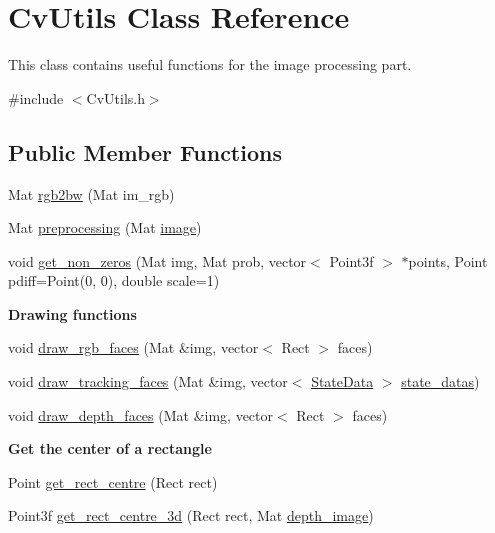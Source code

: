 \hypertarget{classCvUtils}{\section{Cv\-Utils Class Reference}
\label{classCvUtils}
}


This class contains useful functions for the image processing part.  




{\ttfamily \#include $<$Cv\-Utils.\-h$>$}

\subsection*{Public Member Functions}
\begin{DoxyCompactItemize}
\item 
Mat \hyperlink{classCvUtils_aa5bded11699d39af25c420aed2ade0ba}{rgb2bw} (Mat im\-\_\-rgb)
\item 
Mat \hyperlink{classCvUtils_a47189479acb67a1918f35557fc5906a6}{preprocessing} (Mat \hyperlink{createGT_8cpp_aabb27b8973575043030df51be47cd24a}{image})
\item 
void \hyperlink{classCvUtils_a426439fc003e5557644932eee66c48b6}{get\-\_\-non\-\_\-zeros} (Mat img, Mat prob, vector$<$ Point3f $>$ $\ast$points, Point pdiff=Point(0, 0), double scale=1)
\end{DoxyCompactItemize}
\begin{Indent}{\bf Drawing functions}\par
\begin{DoxyCompactItemize}
\item 
void \hyperlink{classCvUtils_a74249b2e9b76b2a8ae2c01c4ff496663}{draw\-\_\-rgb\-\_\-faces} (Mat \&img, vector$<$ Rect $>$ faces)
\item 
void \hyperlink{classCvUtils_ac86c2ad8adca706655831938b63ebaa2}{draw\-\_\-tracking\-\_\-faces} (Mat \&img, vector$<$ \hyperlink{classStateData}{State\-Data} $>$ \hyperlink{social__robot_8cpp_a63ba5e41659a1483954bc6564bca605a}{state\-\_\-datas})
\item 
void \hyperlink{classCvUtils_a6e1f3369c2b553c06f2692c75e20667d}{draw\-\_\-depth\-\_\-faces} (Mat \&img, vector$<$ Rect $>$ faces)
\end{DoxyCompactItemize}
\end{Indent}
\begin{Indent}{\bf Get the center of a rectangle}\par
\begin{DoxyCompactItemize}
\item 
Point \hyperlink{classCvUtils_aa54494728db8503a7311ff2f9ad8ab1c}{get\-\_\-rect\-\_\-centre} (Rect rect)
\item 
Point3f \hyperlink{classCvUtils_a9a91a1dbd7a74ef15257510129308277}{get\-\_\-rect\-\_\-centre\-\_\-3d} (Rect rect, Mat \hyperlink{social__robot__onethread_8cpp_a5b613972ff73fd7b34e0ee18acc5c1a6}{depth\-\_\-image})
\end{DoxyCompactItemize}
\end{Indent}
